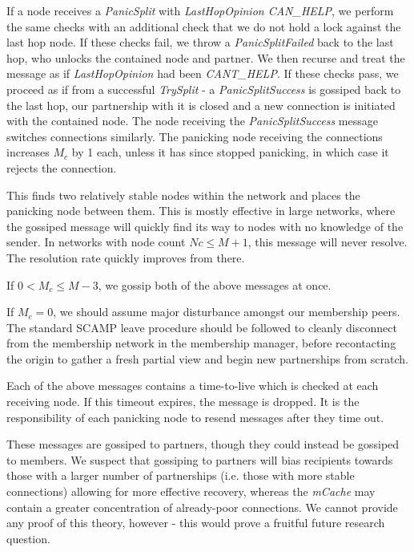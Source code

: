 \documentclass[12pt,a4paper]{article}
\begin{document}
If a node receives a \textit{PanicSplit} with \textit{LastHopOpinion CAN\_HELP}, we perform the same checks with an additional check that we do not hold a lock against the last hop node. If these checks fail, we throw a \textit{PanicSplitFailed} back to the last hop, who unlocks the contained node and partner. We then recurse and treat the message as if \textit{LastHopOpinion} had been \textit{CANT\_HELP}. If these checks pass, we proceed as if from a successful \textit{TrySplit} - a \textit{PanicSplitSuccess} is gossiped back to the last hop, our partnership with it is closed and a new connection is initiated with the contained node. The node receiving the \textit{PanicSplitSuccess} message switches connections similarly. The panicking node receiving the connections increases \(M_c\) by 1 each, unless it has since stopped panicking, in which case it rejects the connection.

This finds two relatively stable nodes within the network and places the panicking node between them. This is mostly effective in large networks, where the gossiped message will quickly find its way to nodes with no knowledge of the sender. In networks with node count \(Nc \leq M + 1\), this message will never resolve. The resolution rate quickly improves from there.

If \(0 < M_c \leq M - 3\), we gossip both of the above messages at once.

If \(M_c = 0\), we should assume major disturbance amongst our membership peers. The standard SCAMP leave procedure should be followed to cleanly disconnect from the membership network in the membership manager, before recontacting the origin to gather a fresh partial view and begin new partnerships from scratch.

Each of the above messages contains a time-to-live which is checked at each receiving node. If this timeout expires, the message is dropped. It is the responsibility of each panicking node to resend messages after they time out.

These messages are gossiped to partners, though they could instead be gossiped to members. We suspect that gossiping to partners will bias recipients towards those with a larger number of partnerships (i.e. those with more stable connections) allowing for more effective recovery, whereas the \textit{mCache} may contain a greater concentration of already-poor connections. We cannot provide any proof of this theory, however - this would prove a fruitful future research question.
\end{document}
